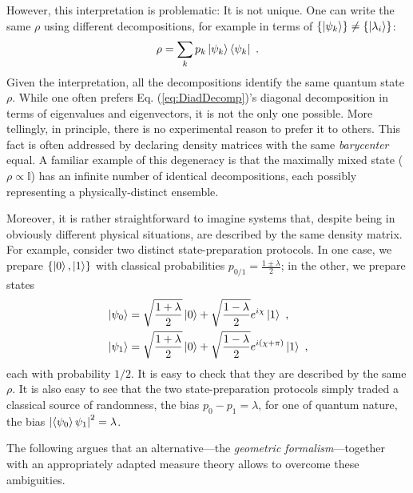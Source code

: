 \documentclass[draft,nofootinbib,pre,twocolumn,showpacs,showkeys,preprintnumbers,floatfix]{revtex4-1}
\newcommand{\1}{\mathbbm{1}}
\begin{document}
However, this interpretation is problematic: It is not unique. One can write
the same $\rho$ using different decompositions, for example in terms of
$\{ \ket{\psi_k}\} \neq \{\ket{\lambda_i}\}$:
\begin{align*}
\rho = \sum_k p_k \ket{\psi_k}\bra{\psi_k}
  ~.
\end{align*}
Given the interpretation, all the decompositions identify the same quantum
state $\rho$. While one often prefers Eq. (\ref{eq:DiadDecomp})'s diagonal
decomposition in terms of eigenvalues and eigenvectors, it is not the only one
possible. More tellingly, in principle, there is no experimental reason to
prefer it to others. This fact is often addressed by declaring density matrices 
with the same \emph{barycenter} equal. A familiar example of this degeneracy 
is that the maximally mixed state ($\rho \propto \mathbb{I}$) has an infinite 
number of identical decompositions, each possibly representing a physically-distinct 
ensemble.

Moreover, it is rather straightforward to imagine systems that, despite being
in obviously different physical situations, are described by the same density
matrix. For example, consider two distinct state-preparation protocols. In one
case, we prepare $\{\ket{0},\ket{1}\}$ with classical probabilities $p_{0/1} = \frac{1\pm \lambda}{2}$; 
in the other, we prepare states 
\begin{subequations}
\begin{align}
&\ket{\psi_0} = \sqrt{\frac{1+\lambda}{2}} \ket{0} + \sqrt{\frac{1-\lambda}{2}} e^{i\chi}\ket{1}~,\\
&\ket{\psi_1} = \sqrt{\frac{1+\lambda}{2}} \ket{0} + \sqrt{\frac{1-\lambda}{2}} e^{i(\chi + \pi)}\ket{1}~,
\end{align}
\end{subequations}
each with probability $1/2$. It is easy to check that they are described by 
the same $\rho$. It is also easy to see that the two state-preparation protocols
simply traded a classical source of randomness, the bias $p_0 - p_1 = \lambda$, 
for one of quantum nature, the bias $\left\vert \braket{\psi_0}{\psi_1} \right\vert^2 = \lambda$.

The following argues that an alternative---the \emph{geometric
formalism}---together with an appropriately adapted measure theory 
allows to overcome these ambiguities.


\end{document}
